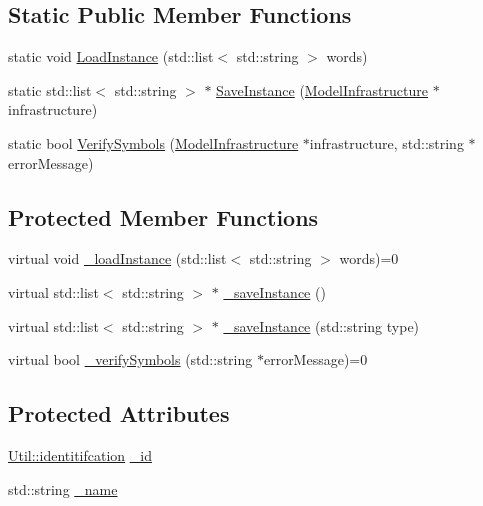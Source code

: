 \subsection*{Static Public Member Functions}
\begin{DoxyCompactItemize}
\item 
static void \hyperlink{class_model_infrastructure_a3e309d346ecc1a96c67a13f5f5f18bf4}{Load\+Instance} (std\+::list$<$ std\+::string $>$ words)
\item 
static std\+::list$<$ std\+::string $>$ $\ast$ \hyperlink{class_model_infrastructure_a4da62e3f3b294abc9e266d1dcfb830cc}{Save\+Instance} (\hyperlink{class_model_infrastructure}{Model\+Infrastructure} $\ast$infrastructure)
\item 
static bool \hyperlink{class_model_infrastructure_a8ac134e84f885300a188fcc0904f1848}{Verify\+Symbols} (\hyperlink{class_model_infrastructure}{Model\+Infrastructure} $\ast$infrastructure, std\+::string $\ast$error\+Message)
\end{DoxyCompactItemize}
\subsection*{Protected Member Functions}
\begin{DoxyCompactItemize}
\item 
virtual void \hyperlink{class_model_infrastructure_ae118c8ad2ac9d4397c40d004af51b2dc}{\+\_\+load\+Instance} (std\+::list$<$ std\+::string $>$ words)=0
\item 
virtual std\+::list$<$ std\+::string $>$ $\ast$ \hyperlink{class_model_infrastructure_a991f46601d9e865f2e27c6cd7a2b702d}{\+\_\+save\+Instance} ()
\item 
virtual std\+::list$<$ std\+::string $>$ $\ast$ \hyperlink{class_model_infrastructure_a0e03d03d3c7166e66dfddac6740c2e1b}{\+\_\+save\+Instance} (std\+::string type)
\item 
virtual bool \hyperlink{class_model_infrastructure_a43de089b35b96c32dd24ca4f9636a388}{\+\_\+verify\+Symbols} (std\+::string $\ast$error\+Message)=0
\end{DoxyCompactItemize}
\subsection*{Protected Attributes}
\begin{DoxyCompactItemize}
\item 
\hyperlink{class_util_ad17d458d9344b10bba64347e514d6d71}{Util\+::identitifcation} \hyperlink{class_model_infrastructure_af6fe00f683f5e29cbcd667e4d3bd24d0}{\+\_\+id}
\item 
std\+::string \hyperlink{class_model_infrastructure_aa73c0444ba8e3515e2aec3154eaad85d}{\+\_\+name}
\end{DoxyCompactItemize}


